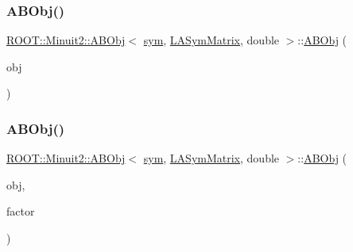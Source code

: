 \mbox{\label{classROOT_1_1Minuit2_1_1ABObj_3_01sym_00_01LASymMatrix_00_01double_01_4_a22738586c6027ada2234556dbab7d406}} 
\subsubsection{\texorpdfstring{ABObj()}{ABObj()}\hspace{0.1cm}{\footnotesize\ttfamily [5/8]}}
{\footnotesize\ttfamily \mbox{\hyperlink{classROOT_1_1Minuit2_1_1ABObj}{R\+O\+O\+T\+::\+Minuit2\+::\+A\+B\+Obj}}$<$ \mbox{\hyperlink{classROOT_1_1Minuit2_1_1sym}{sym}}, \mbox{\hyperlink{classROOT_1_1Minuit2_1_1LASymMatrix}{L\+A\+Sym\+Matrix}}, double $>$\+::\mbox{\hyperlink{classROOT_1_1Minuit2_1_1ABObj}{A\+B\+Obj}} (\begin{DoxyParamCaption}\item[{const \mbox{\hyperlink{classROOT_1_1Minuit2_1_1LASymMatrix}{L\+A\+Sym\+Matrix}} \&}]{obj }\end{DoxyParamCaption})\hspace{0.3cm}{\ttfamily [inline]}}

\mbox{\label{classROOT_1_1Minuit2_1_1ABObj_3_01sym_00_01LASymMatrix_00_01double_01_4_a85558830240c4e85aadec196587fe8e5}} 
\subsubsection{\texorpdfstring{ABObj()}{ABObj()}\hspace{0.1cm}{\footnotesize\ttfamily [6/8]}}
{\footnotesize\ttfamily \mbox{\hyperlink{classROOT_1_1Minuit2_1_1ABObj}{R\+O\+O\+T\+::\+Minuit2\+::\+A\+B\+Obj}}$<$ \mbox{\hyperlink{classROOT_1_1Minuit2_1_1sym}{sym}}, \mbox{\hyperlink{classROOT_1_1Minuit2_1_1LASymMatrix}{L\+A\+Sym\+Matrix}}, double $>$\+::\mbox{\hyperlink{classROOT_1_1Minuit2_1_1ABObj}{A\+B\+Obj}} (\begin{DoxyParamCaption}\item[{const \mbox{\hyperlink{classROOT_1_1Minuit2_1_1LASymMatrix}{L\+A\+Sym\+Matrix}} \&}]{obj,  }\item[{double}]{factor }\end{DoxyParamCaption})\hspace{0.3cm}{\ttfamily [inline]}}

